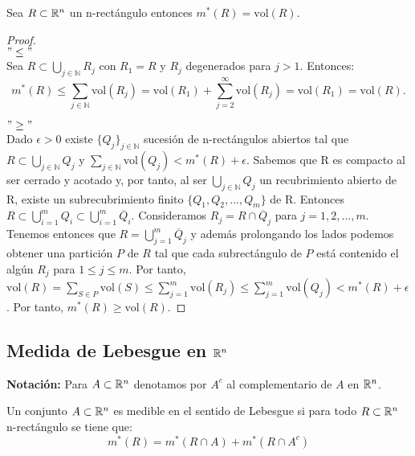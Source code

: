 \begin{proposición}
    Sea $R \subset \mathbb{R}^n$ un n-rectángulo entonces $m^*(R) = \text{vol}(R)$.
\end{proposición}

\begin{proof}
    \leavevmode\\
    $"\leq"$\\
    Sea \( R \subset \bigcup_{j \in \mathbb{N}} R_j \) con \( R_1 = R \) y \( R_j \) degenerados para \( j > 1 \). Entonces:
\[
m^*(R) \leq \sum_{j \in \mathbb{N}} \text{vol}(R_j) = \text{vol}(R_1) + \sum_{j=2}^{\infty} \text{vol}(R_j) = \text{vol}(R_1) = \text{vol}(R).
\]

    $"\geq"$\\
    Dado $\epsilon > 0$ existe $\{Q_j\}_{j \in \mathbb{N}}$ sucesión de n-rectángulos abiertos tal que $R \subset \bigcup_{j \in \mathbb{N}} Q_j$ y $\sum_{j \in \mathbb{N}} \text{vol}(Q_j) < m^*(R) + \epsilon$. Sabemos que R es compacto al ser cerrado y acotado y, por tanto, al ser $\bigcup_{j \in \mathbb{N}} Q_j$ un recubrimiento abierto de R, existe un subrecubrimiento finito $\{Q_1, Q_2, ..., Q_m\}$ de R. Entonces $R \subset \bigcup_{i=1}^m Q_i \subset \bigcup_{i = 1}^m \overline{Q}_i$. Consideramos $R_j = R \cap \overline{Q}_j$ para $j = 1, 2, ..., m$. Tenemos entonces que $R = \bigcup_{j = 1}^{m} \overline{Q}_j$ y además prolongando los lados podemos obtener una partición $P$ de $R$ tal que cada subrectángulo de $P$ está contenido el algún $R_j$ para $1 \leq j \leq m$. Por tanto, $\text{vol}(R) = \sum_{S \in P} \text{vol}(S) \leq \sum_{j = 1}^{m} \text{vol}(R_j) \leq \sum_{j = 1}^{m} \text{vol}(Q_j) < m^*(R) + \epsilon$. Por tanto, $m^*(R) \geq \text{vol}(R)$.
\end{proof}

\subsection{Medida de Lebesgue en $\mathbb{R}^n$}

\textbf{Notación:} Para $A \subset \mathbb{R}^n$ denotamos por $A^c$ al complementario de $A$ en $\mathbb{R}^n$.

\begin{definición} \label{Conjunto Medible}
    Un conjunto $A \subset \mathbb{R}^n$ es medible en el sentido de Lebesgue si para todo $R \subset \mathbb{R}^n$ n-rectángulo se tiene que:
    \begin{equation}
        m^*(R) = m^*(R \cap A) + m^*(R \cap A^c)
    \end{equation}
\end{definición}

